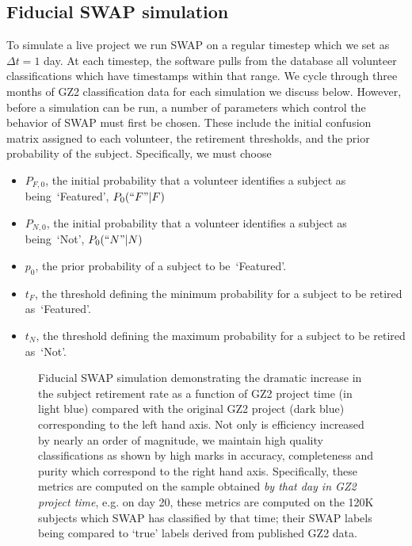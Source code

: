 \documentclass[twocolumn]{aastex6}
\newcommand{\Pf}{$P_{F,0}$}
\newcommand{\Pn}{$P_{N,0}$}
\newcommand{\p}{$p_0$}
\newcommand{\tf}{$t_F$}
\newcommand{\tn}{$t_N$}
\newcommand{\feat}{`Featured'}
\newcommand{\notfeat}{`Not'}
\begin{document}
\subsection{Fiducial SWAP simulation}

To simulate a live project we run SWAP on a regular timestep which we set as $\Delta t = 1$ day. 
At each timestep, the software pulls from the database all volunteer classifications which
have timestamps within that range. We cycle through three months of GZ2 classification data 
for each simulation we discuss below. However, before a simulation can be run, a number 
of parameters which control the behavior of SWAP must first be chosen. These include
 the initial confusion matrix assigned to each volunteer, the retirement
thresholds, and the prior probability of the subject. Specifically, we must choose 
\begin{itemize}
\item \Pf, the initial probability that a volunteer identifies a subject as being~\feat, $P_0(``F"|F)$
\item \Pn, the initial probability that a volunteer identifies a subject as being~\notfeat, $P_0(``N"|N)$
\item \p, the prior probability of a subject to be~\feat.
\item \tf, the threshold defining the minimum probability for a subject to be retired as~\feat.
\item \tn, the threshold defining the maximum probability for a subject to be retired as~\notfeat.
\end{itemize}


\begin{figure}[ht!]
\caption{Fiducial SWAP simulation demonstrating the dramatic increase in the subject retirement rate as a function of GZ2 project time (in light blue) compared with the original GZ2 project (dark blue) corresponding to the left hand axis. Not only is efficiency increased by nearly an order of magnitude, we maintain high quality classifications as shown by high marks in accuracy, completeness and purity which correspond to the right hand axis.  Specifically, these metrics are computed on the sample obtained \textit{by that day in GZ2 project time}, e.g. on day 20, these metrics are computed on the 120K subjects which SWAP has classified by that time; their SWAP labels being compared to `true' labels derived from published GZ2 data. \label{fig: fiducial run}}
\end{figure}
\end{document}
